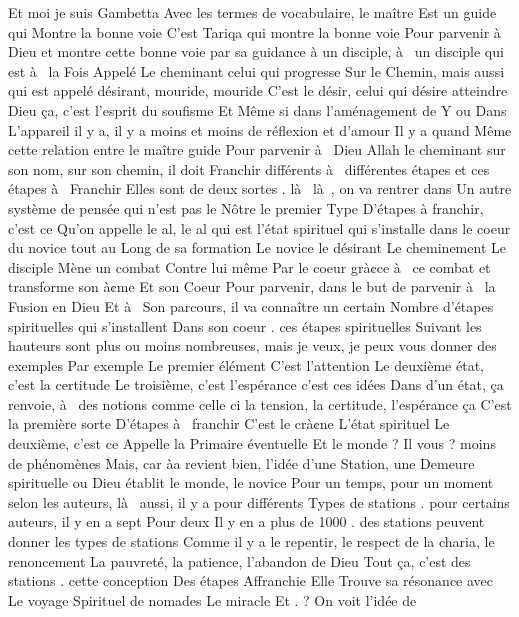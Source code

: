 Et moi je suis Gambetta  Avec les termes de vocabulaire, le maître 
Est un guide qui  
Montre la bonne voie  C'est Tariqa qui  montre la bonne voie 
Pour parvenir à  
Dieu et montre cette bonne voie par sa guidance 
à  un disciple, à  un disciple qui  est à  la 
Fois 
Appelé 
Le cheminant 
 celui qui  progresse 
Sur le 
Chemin, mais aussi qui  est appelé désirant, mouride, mouride  C'est le désir,  celui qui  désire atteindre Dieu 
 ça, c'est l'esprit du soufisme  Et  
Même si dans l'aménagement 
de Y ou 
Dans 
L'appareil il y a, il y a moins et moins de réflexion et d'amour  Il y a quand 
Même cette relation entre le maître guide 
Pour parvenir à  Dieu 
Allah le cheminant sur son nom, sur son chemin, il doit 
Franchir différents à  différentes étapes et ces étapes à  
Franchir  Elles sont de deux sortes   . là   là , on va rentrer dans 
Un autre système de pensée qui  n'est pas le 
Nôtre   le premier 
Type 
D'étapes 
à  franchir, c'est ce 
Qu'on appelle le al, le al 
qui  est l'état spirituel 
qui  s'installe dans le coeur du novice 
 tout au 
Long de sa formation 
Le novice le désirant 
Le cheminement 
Le disciple 
Mène un combat 
Contre lui même 
Par le coeur grà¢ce à  ce combat et transforme son à¢me 
Et son 
Coeur 
Pour parvenir, dans le but de parvenir à  la 
Fusion en Dieu 
Et à  
Son parcours, il va connaître un certain 
Nombre d'étapes spirituelles qui  s'installent 
Dans son coeur 
 . ces étapes spirituelles 
Suivant les hauteurs sont plus ou moins nombreuses, mais je veux, je peux vous donner des exemples  Par exemple 
Le premier élément 
C'est l'attention 
Le deuxième état, c'est la certitude  Le troisième, c'est l'espérance   c'est ces idées  Dans d'un état, ça renvoie, à  des notions comme celle ci la tension, la certitude, l'espérance 
 ça 
C'est la première sorte 
D'étapes à  franchir  C'est le crà¢ne 
L'état spirituel  Le deuxième, c'est ce 
Appelle la 
Primaire 
éventuelle 
Et le monde ?
Il vous ?
 moins de phénomènes  Mais, car 
àa revient bien, l'idée d'une 
Station, une 
Demeure spirituelle ou 
Dieu 
établit le monde, le novice 
Pour un temps, pour un moment 
 selon les auteurs, là  aussi, il y a pour différents 
Types de stations   . pour certains auteurs, il y en a sept  Pour deux 
Il y en a plus de 1000   . des stations peuvent donner les types de stations  Comme il y a le repentir, le respect de la charia, le renoncement 
La pauvreté, la patience, l'abandon de Dieu 
Tout ça, c'est des stations 
 . cette conception 
Des étapes 
Affranchie 
Elle 
Trouve sa résonance avec 
Le voyage 
Spirituel de nomades  Le miracle 
Et  . ? On voit l'idée de 
